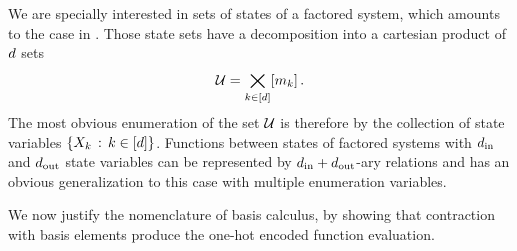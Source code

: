 We are specially interested in sets of states of a factored system, which amounts to the case in .
Those state sets have a decomposition into a cartesian product of $d$ sets
	\[ \mathcal{U} = \bigtimes_{k\in[d]}[m_{k}] \, . \]
The most obvious enumeration of the set $\mathcal{U}$ is therefore by the collection of state variables $\{X_{k}\, : \, k\in[d] \}$.
Functions between states of factored systems with $d_{\mathrm{in}}$ and $d_{\mathrm{out}}$ state variables can be represented by $d_{\mathrm{in}}+d_{\mathrm{out}}$-ary relations and  has an obvious generalization to this case with multiple enumeration variables.

%
%




We now justify the nomenclature of basis calculus, by showing that contraction with basis elements produce the one-hot encoded function evaluation.

